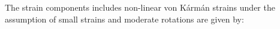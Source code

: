 \documentclass[journal]{new-aiaa}
\begin{document}
The strain components includes non-linear von K\'arm\'an strains under the assumption of small strains and moderate rotations are given by:
\end{document}

